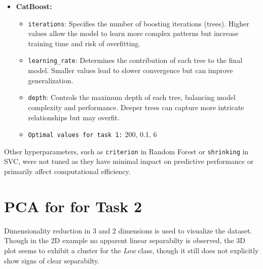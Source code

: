 \documentclass{article}
\begin{document}
\begin{itemize}
    \item \textbf{CatBoost:}
    \begin{itemize}
        \item \texttt{iterations}: Specifies the number of boosting iterations (trees). Higher values allow the model to learn more complex patterns but increase training time and risk of overfitting.
        \item \texttt{learning\_rate}: Determines the contribution of each tree to the final model. Smaller values lead to slower convergence but can improve generalization.
        \item \texttt{depth}: Controls the maximum depth of each tree, balancing model complexity and performance. Deeper trees can capture more intricate relationships but may overfit.
        \item \texttt{Optimal values for task 1:} 200, 0.1, 6
    \end{itemize}


\end{itemize}

Other hyperparameters, such as \texttt{criterion} in Random Forest or \texttt{shrinking} in SVC, were not tuned as they have minimal impact on predictive performance or primarily affect computational efficiency.

\newpage
\section{PCA for for Task 2}
\label{appendix:pca_non_linear_data}

Dimensionality reduction in 3 and 2 dimensions is used to visualize the dataset. Though in the 2D example no apparent linear separabilty is observed, the 3D plot seems to exhibit a cluster for the \textit{Low} class, though it still does not explicitly show signs of clear separabilty.
\end{document}
